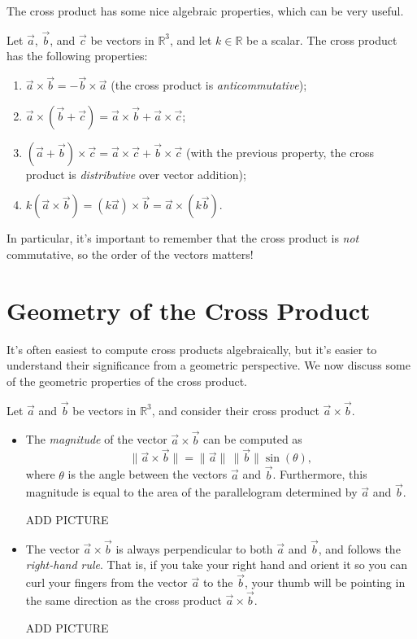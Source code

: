 \documentclass{ximera}
\begin{document}
The cross product has some nice algebraic properties, which can be very useful.

\begin{proposition}
Let $\vec{a}$, $\vec{b}$, and $\vec{c}$ be vectors in $\mathbb{R}^3$, and let $k\in\mathbb{R}$ be a scalar. The cross product has the following properties:
\begin{enumerate}
\item $\vec{a}\times \vec{b} = -\vec{b}\times \vec{a}$ (the cross product is \emph{anticommutative});
\item $\vec{a}\times(\vec{b}+\vec{c}) = \vec{a}\times\vec{b}+\vec{a}\times\vec{c}$;
\item $(\vec{a}+\vec{b})\times\vec{c} = \vec{a}\times\vec{c}+\vec{b}\times\vec{c}$ (with the previous property, the cross product is \emph{distributive} over vector addition);
\item $k(\vec{a}\times\vec{b})=(k\vec{a})\times\vec{b} = \vec{a}\times(k\vec{b})$.
\end{enumerate}
\end{proposition}

In particular, it's important to remember that the cross product is \emph{not} commutative, so the order of the vectors matters!

\section{Geometry of the Cross Product}

It's often easiest to compute cross products algebraically, but it's easier to understand their significance from a geometric perspective. We now discuss some of the geometric properties of the cross product.

\begin{proposition}
Let $\vec{a}$ and $\vec{b}$ be vectors in $\mathbb{R}^3$, and consider their cross product $\vec{a}\times\vec{b}$.
\begin{itemize}
\item The \emph{magnitude} of the vector $\vec{a}\times\vec{b}$ can be computed as 
\[
\|\vec{a}\times\vec{b}\| = \|\vec{a}\|\,\|\vec{b}\|\sin(\theta),
\]
where $\theta$ is the angle between the vectors $\vec{a}$ and $\vec{b}$. Furthermore, this magnitude is equal to the area of the parallelogram determined by $\vec{a}$ and $\vec{b}$.

ADD PICTURE
\item The vector $\vec{a}\times\vec{b}$ is always perpendicular to both $\vec{a}$ and $\vec{b}$, and follows the \emph{right-hand rule}. That is, if you take your right hand and orient it so you can curl your fingers from the vector $\vec{a}$ to the $\vec{b}$, your thumb will be pointing in the same direction as the cross product $\vec{a}\times\vec{b}$.

ADD PICTURE
\end{itemize}
\end{proposition}
\end{document}
